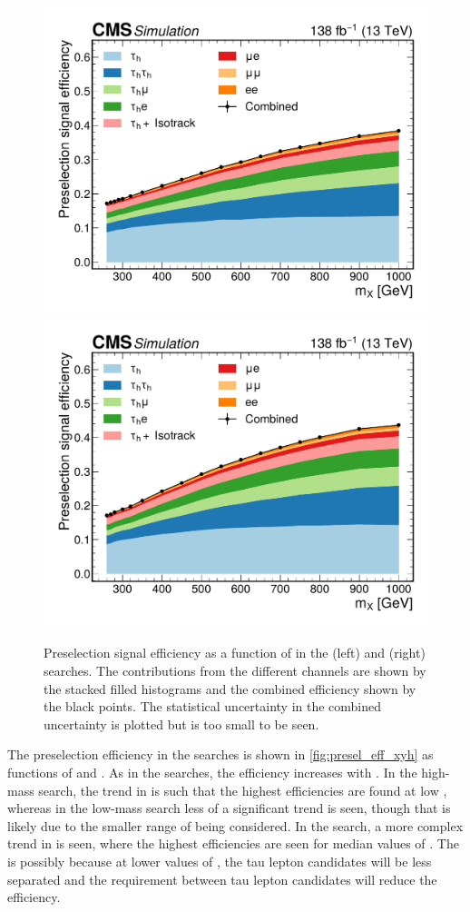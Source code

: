 \begin{figure}
  \centering
  \includegraphics[width=.49\linewidth]{Figures/Dihiggs/trigger/Radion/sig_eff_stack_thesis.pdf}
  \includegraphics[width=.49\linewidth]{Figures/Dihiggs/trigger/Graviton/sig_eff_stack_thesis.pdf}
  \caption[Preselection Efficiency as a Function of \mX in the \XHH Searches]{Preselection signal efficiency as a function of \mX in the \XZeroHH (left) and \XTwoHH(right) searches. The contributions from the different channels are shown by the stacked filled histograms and the combined efficiency shown by the black points. The statistical uncertainty in the combined uncertainty is plotted but is too small to be seen.}\label{fig:presel_eff_graviton}
\end{figure}

The preselection efficiency in the \XYH searches is shown in \cref{fig:presel_eff_xyh} as functions of \mX and \mY. As in the \XHH searches, the efficiency increases with \mX. In the high-mass \XYggHtt search, the trend in \mY is such that the highest efficiencies are found at low \mY, whereas in the low-mass search less of a significant trend is seen, though that is likely due to the smaller range of \mY being considered. In the \XYttHgg search, a more complex trend in \mY is seen, where the highest efficiencies are seen for median values of \mY. The is possibly because at lower values of \mY, the tau lepton candidates will be less separated and the \dR requirement between tau lepton candidates will reduce the efficiency.


